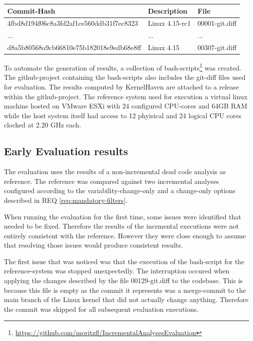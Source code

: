 \documentclass[a4paper]{article}
\begin{document}
\begin{tabular}{l | l | l}
	Commit-Hash & Description & File \\ \hline
	4fbd8d194f06c8a3fd2af1ce560ddb31f7ec8323 & Linux 4.15-rc1 & 00001-git.diff \\
	... & ... & ... \\
	d8a5b80568a9cb66810e75b182018e9edb68e8ff & Linux 4.15  & 00307-git.diff \\
\end{tabular}

To automate the generation of results, a collection of bash-scripts\footnote{\url{https://github.com/moritzfl/IncrementalAnalysesEvaluation}} was created. The github-project containing the bash-scripts also includes the git-diff files used for evaluation. The results computed by KernelHaven are attached to a release within the github-project. The reference system used for execution a virtual linux machine hosted on VMware ESXi \cite{ESXi-f0l} with 24 configured CPU-cores and 64GB RAM while the host system itself had access to 12 phyisical and 24 logical CPU cores clocked at 2.20 GHz each.

\subsection{Early Evaluation results}

The evaluation uses the results of a non-incremental dead code analysis as reference.  The reference was compared against two incremental analyses configured according to the variability-change-only and a change-only options described in REQ \ref{req:mandatory-filters}.

When running the evaluation for the first time, some issues were identified that needed to be fixed. Therefore the results of the incrmental executions were not entirely consistent with the reference. However they were close enough to assume that resolving those issues would produce consistent results.

The first issue that was noticed was that the execution of the bash-script for the reference-system was stopped unexpectedly. The interruption occured when applying the changes described by the file 00129-git.diff to the codebase. This is because this file is empty as the commit it represents was a merge-commit to the main branch of the Linux kernel that did not actually change anything. Therefore the commit was skipped for all subsequent evaluation executions.
\end{document}
